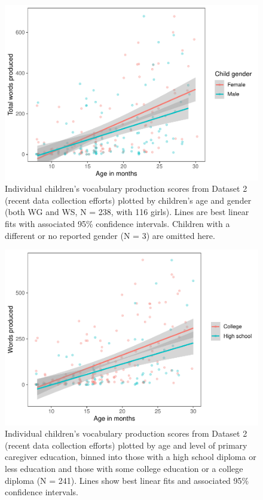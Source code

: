 \documentclass[
  english,
  ,man,floatsintext]{apa6}
\begin{document}
\begin{figure}
\centering
\includegraphics{webcdi_paper_files/figure-latex/genderses-1.pdf}
\caption{\label{fig:genderses}Individual children's vocabulary production scores from Dataset 2 (recent data collection efforts) plotted by children's age and gender (both WG and WS, N = 238, with 116 girls). Lines are best linear fits with associated 95\% confidence intervals. Children with a different or no reported gender (N = 3) are omitted here.}
\end{figure}

\begin{figure}
\centering
\includegraphics{webcdi_paper_files/figure-latex/momedses-1.pdf}
\caption{\label{fig:momedses}Individual children's vocabulary production scores from Dataset 2 (recent data collection efforts) plotted by age and level of primary caregiver education, binned into those with a high school diploma or less education and those with some college education or a college diploma (N = 241). Lines show best linear fits and associated 95\% confidence intervals.}
\end{figure}
\end{document}
